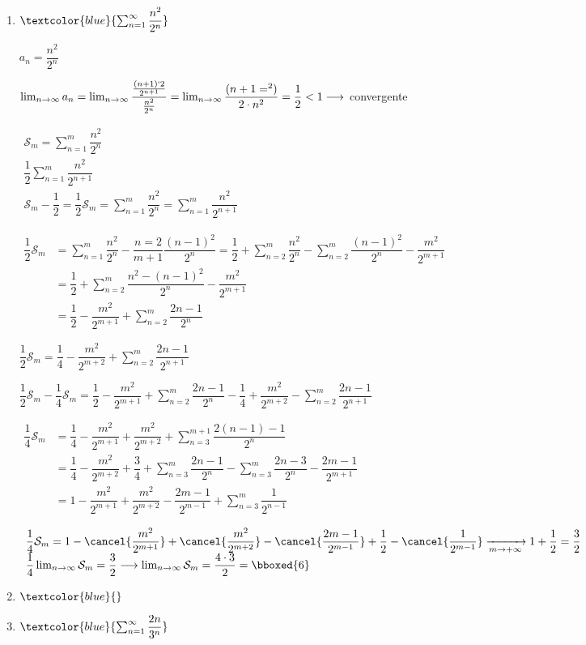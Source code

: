 \begin{enumerate}[label=\color{red}\alph*)]
	\item $\textcolor{blue}{\sum_{n=1}^{\infty}\dfrac{n^2}{2^n}}$
	
	$a_n=\dfrac{n^2}{2^n}$
	
	$\lim_{n\to\infty}a_n=\lim_{n\to\infty}\dfrac{\frac{(n+1)`2}{2^{n+1}}}{\frac{n^2}{2^n}}=\lim_{n\to\infty}\dfrac{(n+1=^2)}{2\cdot n^2}=\dfrac{1}{2}<1\longrightarrow$ convergente
	
	$\begin{array}{r}
		\mathcal{S}_m=\sum_{n=1}^{m}\dfrac{n^2}{2^n}\\
	\dfrac{1}{2}\sum_{n=1}^{m}\dfrac{n^2}{2^{n+1}}\\
	\hline
	\mathcal{S}_m-\dfrac{1}{2}=\dfrac{1}{2}\mathcal{S}_m=\sum_{n=1}^{m}\dfrac{n^2}{2^n}=\sum_{n=1}^{m}\dfrac{n^2}{2^{n+1}}
	\end{array}$
	
	$\begin{aligned}
		\dfrac{1}{2}\mathcal{S}_m & =\sum_{n=1}^{m}\dfrac{n^2}{2^n}-\dfrac{n=2}{m+1}\dfrac{(n-1)^2}{2^n}=\dfrac{1}{2}+\sum_{n=2}^{m}\dfrac{n^2}{2^n}-\sum_{n=2}^{m}\dfrac{(n-1)^2}{2^n}-\dfrac{m^2}{2^{m+1}}\\
		&=\dfrac{1}{2}+\sum_{n=2}^{m}\dfrac{n^2-(n-1)^2}{2^n}-\dfrac{m^2}{2^{m+1}}\\
		&=\dfrac{1}{2}-\dfrac{m^2}{2^{m+1}}+\sum_{n=2}^{m}\dfrac{2n-1}{2^n}
	\end{aligned}$
	
	$\dfrac{1}{2}\mathcal{S}_m=\dfrac{1}{4}-\dfrac{m^2}{2^{m+2}}+\sum_{n=2}^{m}\dfrac{2n-1}{2^{n+1}}$
	
	$\dfrac{1}{2}\mathcal{S}_m-\dfrac{1}{4}\mathcal{S}_m=\dfrac{1}{2}-\dfrac{m^2}{2^{m+1}}+\sum_{n=2}^{m}\dfrac{2n-1}{2^n}-\dfrac{1}{4}+\dfrac{m^2}{2^{m+2}}-\sum_{n=2}^{m}\dfrac{2n-1}{2^{n+1}}$
	
	$\begin{aligned}
		\dfrac{1}{4}\mathcal{S}_m&=\dfrac{1}{4}-\dfrac{m^2}{2^{m+1}}+\dfrac{m^2}{2^{m+2}}+\sum_{n=3}^{m+1}\dfrac{2(n-1)-1}{2^n}\\
		&=\dfrac{1}{4}-\dfrac{m^2}{2^{m+2}}+\dfrac{3}{4}+\sum_{n=3}^{m}\dfrac{2n-1}{2^n}-\sum_{n=3}^{m}\dfrac{2n-3}{2^n}-\dfrac{2m-1}{2^{m+1}}\\
		&=1-\dfrac{m^2}{2^{m+1}}+\dfrac{m^2}{2^{m+2}}-\dfrac{2m-1}{2^{m-1}}+\sum_{n=3}^{m}\dfrac{1}{2^{n-1}}
	\end{aligned}$
	
	$\begin{array}{l}
		\dfrac{1}{4}\mathcal{S}_m=1-\cancel{\dfrac{m^2}{2^{m+1}}}+\cancel{\dfrac{m^2}{2^{m+2}}}-\cancel{\dfrac{2m-1}{2^{m-1}}}+\dfrac{1}{2}-\cancel{\dfrac{1}{2^{m-1}}}\xrightarrow[m\to+\infty]{}1+\dfrac{1}{2}=\dfrac{3}{2}\\
		\dfrac{1}{4}\lim_{n\to\infty}\mathcal{S}_m=\dfrac{3}{2}\longrightarrow \lim_{n\to\infty}\mathcal{S}_m=\dfrac{4\cdot3}{2}=\bboxed{6}
	\end{array}$
	\item $\textcolor{blue}{}$
	\item $\textcolor{blue}{\sum_{n=1}^{\infty}\dfrac{2n}{3^n}}$
	

\end{enumerate}
